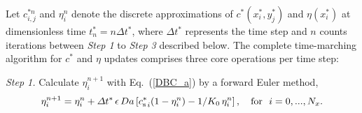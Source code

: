 \documentclass[lineno]{JFM-FLM_Au}
\begin{document}
{%

Let $c_{i,j}^{*n}$ and $\eta_{i}^n$ denote the discrete approximations of $c^*(x^*_i, y^*_j)$ and $\eta(x^*_i)$ at dimensionless time $t^*_n=n\Delta t^*$, where $\Delta t^*$ represents the time step and $n$ counts iterations between \textit{Step 1} to \textit{Step 3} described below. The complete time-marching algorithm for $c^*$ and $\eta$ updates comprises three core operations per time step:




\noindent \textit{Step 1.} Calculate $\eta_i^{n+1}$ with Eq.~(\ref{DBC_a}) by a forward Euler method,
\begin{equation}{\label{Forward Difference}}
\eta_i^{n+1} = \eta_i^n + \Delta t^* \,\epsilon \, Da \left[ {c^*_{\rm s}}_i(1-\eta_i^n) - 1/K_0 \,\eta_i^n \right],  \quad \text{for } \ i = 0,...,N_x.
\end{equation}

}
\end{document}
